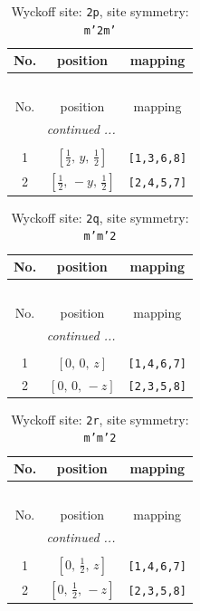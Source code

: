 \documentclass[fleqn,8pt]{jsarticle}
\begin{document}
\begin{longtable}{ccc}
\caption{Wyckoff site: {\tt 2p}, site symmetry: {\tt m'2m'}}
 \\
 \hline \hline
No. & position & mapping \\ \hline \endfirsthead

\multicolumn{2}{l}{\tablename\ \thetable{}} \\
 \hline \hline
No. & position & mapping \\ \hline \endhead

 \hline \hline
\multicolumn{2}{r}{\footnotesize\it continued ...} \\ \endfoot

 \hline \hline
\multicolumn{2}{r}{} \\ \endlastfoot

1 & $\left[ \frac{1}{2},\, y,\, \frac{1}{2} \right]$ & {\tt [1,3,6,8]} \\ \hline
2 & $\left[ \frac{1}{2},\, - y,\, \frac{1}{2} \right]$ & {\tt [2,4,5,7]} \\
\end{longtable}
\renewcommand{\arraystretch}{1.2}
\begin{longtable}{ccc}
\caption{Wyckoff site: {\tt 2q}, site symmetry: {\tt m'm'2}}
 \\
 \hline \hline
No. & position & mapping \\ \hline \endfirsthead

\multicolumn{2}{l}{\tablename\ \thetable{}} \\
 \hline \hline
No. & position & mapping \\ \hline \endhead

 \hline \hline
\multicolumn{2}{r}{\footnotesize\it continued ...} \\ \endfoot

 \hline \hline
\multicolumn{2}{r}{} \\ \endlastfoot

1 & $\left[ 0,\, 0,\, z \right]$ & {\tt [1,4,6,7]} \\ \hline
2 & $\left[ 0,\, 0,\, - z \right]$ & {\tt [2,3,5,8]} \\
\end{longtable}
\renewcommand{\arraystretch}{1.2}
\begin{longtable}{ccc}
\caption{Wyckoff site: {\tt 2r}, site symmetry: {\tt m'm'2}}
 \\
 \hline \hline
No. & position & mapping \\ \hline \endfirsthead

\multicolumn{2}{l}{\tablename\ \thetable{}} \\
 \hline \hline
No. & position & mapping \\ \hline \endhead

 \hline \hline
\multicolumn{2}{r}{\footnotesize\it continued ...} \\ \endfoot

 \hline \hline
\multicolumn{2}{r}{} \\ \endlastfoot

1 & $\left[ 0,\, \frac{1}{2},\, z \right]$ & {\tt [1,4,6,7]} \\ \hline
2 & $\left[ 0,\, \frac{1}{2},\, - z \right]$ & {\tt [2,3,5,8]} \\
\end{longtable}
\end{document}
